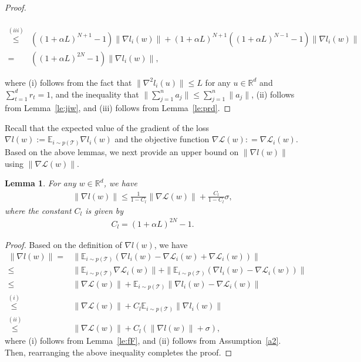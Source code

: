 \documentclass{osudissert96}
\newtheorem{lemma}{Lemma}
\begin{document}
\begin{proof}
\begin{small}
\begin{align}
	\\\overset{(iii)}\leq & ((1+\alpha L)^{N+1}-1)\|\nabla l_i(w)\| + (1+\alpha L)^{N+1} ((1+\alpha L)^{N-1}-1)\|\nabla l_i(w)\|  \nonumber
	\\ = & ((1+\alpha L)^{2N} - 1)\|\nabla l_i(w)\|,\nonumber
	\end{align}
	\end{small}
\hspace{-0.12cm}	where (i) follows from the fact that $\|\nabla^2 l_i(u)\| \leq L$ for any $u\in \mathbb{R}^d$ and $\sum_{t=1}^d r_t =1$,  and the inequality that $\|\sum_{j=1} ^n a_j\|\leq \sum_{j=1} ^n\|a_j\|$,  (ii) follows from  Lemma~\ref{le:jiw}, and (iii) follows from Lemma~\ref{le:prd}.
\end{proof}

Recall that the expected value of the gradient of the loss $\nabla l(w):=\mathbb{E}_{i\sim p(\mathcal{T})} \nabla l_i(w)$ and the objective function $\nabla \mathcal{L}(w): = \nabla \mathcal{L}_i(w)$. Based on the above lemmas, we next provide an upper bound on $\|\nabla l(w)\|$ using $\|\nabla \mathcal{L}(w)\|$. 
\begin{lemma}\label{le:lL}
	For any $w\in\mathbb{R}^d$, we have 
	\begin{align*}
	\|\nabla l(w)\| \leq \frac{1}{1-C_l} \|\nabla \mathcal{L}(w)\| + \frac{C_l}{1-C_l} \sigma,
	\end{align*}
	where the constant $C_l$ is given by 
     \begin{align*}%
	C_l = (1+\alpha L)^{2N} - 1.
	\end{align*}
\end{lemma}
\begin{proof}
	Based on the definition of $\nabla l(w)$, we have 
	\begin{align}
	\|\nabla l(w)\| =& \|\mathbb{E}_{i\sim p(\mathcal{T})} (\nabla l_i(w) -\nabla \mathcal{L}_i(w) +\nabla \mathcal{L}_i(w) )\| \nonumber
	\\\leq& \|\mathbb{E}_{i\sim p(\mathcal{T})} \nabla \mathcal{L}_i(w) \| + \|\mathbb{E}_{i\sim p(\mathcal{T})} (\nabla l_i(w) -\nabla \mathcal{L}_i(w)  ) \|   \nonumber
	\\\leq & \|\nabla \mathcal{L}(w) \| + \mathbb{E}_{i\sim p(\mathcal{T})} \|\nabla l_i(w) -\nabla \mathcal{L}_i(w)   \|   \nonumber
	\\\overset{(i)}\leq & \|\nabla \mathcal{L}(w) \| + C_l\mathbb{E}_{i\sim p(\mathcal{T})}\|\nabla l_i(w)   \|  \nonumber
	\\ \overset{(ii)} \leq & \|\nabla \mathcal{L}(w) \| +  C_l(\|\nabla l(w)   \| + \sigma), \nonumber
	\end{align}
	where (i) follows from Lemma~\ref{le:fF}, and (ii) follows from Assumption~\ref{a2}. Then, rearranging the above inequality completes the proof.  
\end{proof}
\end{document}
